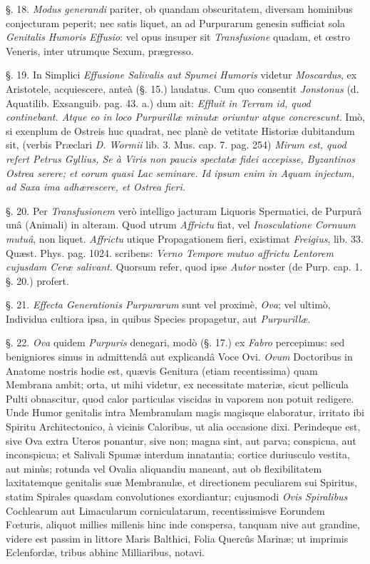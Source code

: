 \documentclass[a4paper, 11pt, oneside, polutonikogreek, german]{article}
\begin{document}
§. 18. \emph{Modus generandi} pariter, ob quandam obscuritatem, diversam hominibus conjecturam peperit; nec satis liquet, an ad Purpurarum genesin sufficiat sola \emph{Genitalis Humoris Effusio}: vel opus insuper sit \emph{Transfusione} quadam, et œstro Veneris, inter utrumque Sexum, prægresso.

§. 19. In Simplici \emph{Effusione Salivalis aut Spumei Humoris} videtur \emph{Moscardus}, ex Aristotele, acquiescere, anteà (§. 15.) laudatus. Cum quo consentit \emph{Jonstonus} (d. Aquatilib. Exsanguib. pag. 43. a.) dum ait: \emph{Effluit in Terram id, quod continebant. Atque eo in loco Purpurillæ minutæ oriuntur atque concrescunt.} Imò, si exenplum de Ostreis huc quadrat, nec planè de vetitate Historiæ dubitandum sit, (verbis Præclari \emph{D. Wormii} lib. 3. Mus. cap. 7. pag. 254) \emph{Mirum est, quod refert Petrus Gyllius, Se à Viris non paucis spectatæ fidei accepisse, Byzantinos Ostrea serere; et eorum quasi Lac seminare. Id ipsum enim in Aquam injectum, ad Saxa ima adhærescere, et Ostrea fieri.}

§. 20. Per \emph{Transfusionem} verò intelligo jacturam Liquoris Spermatici, de Purpurâ unâ (Animali) in alteram. Quod utrum \emph{Affrictu} fiat, vel \emph{Inosculatione Cornuum mutuâ}, non liquet. \emph{Affrictu} utique Propagationem fieri, existimat \emph{Freigius}, lib. 33. Quæst. Phys. pag. 1024. scribens: \emph{Verno Tempore mutuo affrictu Lentorem cujusdam Ceræ salivant.} Quorsum refer, quod ipse \emph{Autor} noster (de Purp. cap. 1. §. 20.) profert.

§. 21. \emph{Effecta Generationis Purpurarum} sunt vel proximè, \emph{Ova}; vel ultimò, Individua cultiora ipsa, in quibus Species propagetur, aut \emph{Purpurillæ}.

§. 22. \emph{Ova} quidem \emph{Purpuris} denegari, modò (§. 17.) ex \emph{Fabro} percepimus: sed benigniores simus in admittendâ aut explicandâ Voce Ovi. \emph{Ovum} Doctoribus in Anatome nostris hodie est, quævis Genitura (etiam recentissima) quam Membrana ambit; orta, ut mihi videtur, ex necessitate materiæ, sicut pellicula Pulti obnascitur, quod calor particulas viscidas in vaporem non potuit redigere. Unde Humor genitalis intra Membranulam magis magisque elaboratur, irritato ibi Spiritu Architectonico, à vicinis Caloribus, ut alia occasione dixi. Perindeque est, sive Ova extra Uteros ponantur, sive non; magna sint, aut parva; conspicua, aut inconspicua; et Salivali Spumæ interdum innatantia; cortice duriusculo vestita, aut minùs; rotunda vel Ovalia aliquandiu maneant, aut ob flexibilitatem laxitatemque genitalis suæ Membranulæ, et directionem peculiarem sui Spiritus, statim Spirales quasdam convolutiones exordiantur; cujusmodi \emph{Ovis Spiralibus} Cochlearum aut Limacularum corniculatarum, recentissimisve Eorundem Fœturis, aliquot millies millenis hinc inde conspersa, tanquam nive aut grandine, videre est passim in littore Maris Balthici, Folia Quercûs Marinæ; ut imprimis Eclenfordæ, tribus abhinc Milliaribus, notavi.
\end{document}
